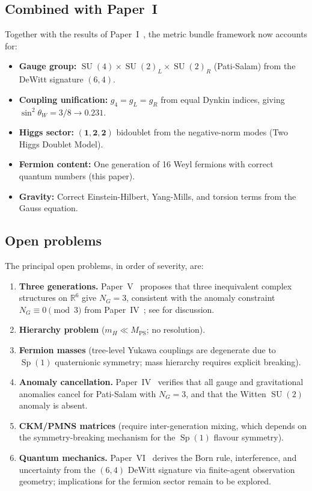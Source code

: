 \documentclass[12pt,a4paper]{article}
\theoremstyle{definition}
\newcommand{\SU}{\operatorname{SU}}
\newcommand{\Sp}{\operatorname{Sp}}
\newcommand{\R}{\mathbb{R}}
\begin{document}
\subsection{Combined with Paper~I}

Together with the results of Paper~I~\cite{Paper1}, the metric bundle framework now accounts for:
\begin{itemize}[nosep]
\item \textbf{Gauge group:} $\SU(4) \times \SU(2)_L \times \SU(2)_R$ (Pati-Salam) from the DeWitt signature $(6,4)$.
\item \textbf{Coupling unification:} $g_4 = g_L = g_R$ from equal Dynkin indices, giving $\sin^2\theta_W = 3/8 \to 0.231$.
\item \textbf{Higgs sector:} $(\mathbf{1}, \mathbf{2}, \mathbf{2})$ bidoublet from the negative-norm modes (Two Higgs Doublet Model).
\item \textbf{Fermion content:} One generation of 16 Weyl fermions with correct quantum numbers (this paper).
\item \textbf{Gravity:} Correct Einstein-Hilbert, Yang-Mills, and torsion terms from the Gauss equation.
\end{itemize}

\subsection{Open problems}

The principal open problems, in order of severity, are:
\begin{enumerate}
\item \textbf{Three generations.} Paper~V~\cite{Paper5} proposes that three inequivalent complex structures on $\R^6$ give $N_G = 3$, consistent with the anomaly constraint $N_G \equiv 0\pmod{3}$ from Paper~IV~\cite{Paper4}; see  for discussion.
\item \textbf{Hierarchy problem} ($m_H \ll M_{\mathrm{PS}}$; no resolution).
\item \textbf{Fermion masses} (tree-level Yukawa couplings are degenerate due to $\Sp(1)$ quaternionic symmetry; mass hierarchy requires explicit breaking).
\item \textbf{Anomaly cancellation.} Paper~IV~\cite{Paper4} verifies that all gauge and gravitational anomalies cancel for Pati-Salam with $N_G = 3$, and that the Witten $\SU(2)$ anomaly is absent.
\item \textbf{CKM/PMNS matrices} (require inter-generation mixing, which depends on the symmetry-breaking mechanism for the $\Sp(1)$ flavour symmetry).
\item \textbf{Quantum mechanics.} Paper~VI~\cite{Paper6} derives the Born rule, interference, and uncertainty from the $(6,4)$ DeWitt signature via finite-agent observation geometry; implications for the fermion sector remain to be explored.
\end{enumerate}
\end{document}

